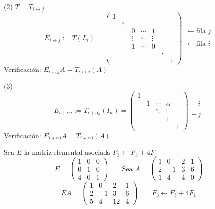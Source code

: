 \documentclass[11pt,a4paper]{article}
\begin{document}
(2) $T=T_{i\leftrightarrow j}$
\[
E_{i\leftrightarrow j}:=T(I_n)=\begin{pmatrix}
1&&&&&&\\
&\ddots&&&&&\\
&&0&\cdots&1&&\\
&&\vdots&\ddots&\vdots&&\\
&&1&\cdots&0&&\\
&&&&&\ddots&\\
&&&&&&1
\end{pmatrix}
\begin{matrix}\\\\\leftarrow\text{fila } j\\\\\leftarrow\text{fila } i\\\\\\\end{matrix}
\]
Verificación: $E_{i\leftrightarrow j}A=T_{i\leftrightarrow j}(A)$

(3)
\[
E_{i+\alpha j}:=T_{i+\alpha j}(I_n)=\begin{pmatrix}
1&&&&\\
&1&\cdots&\alpha&\\
&&\ddots&\vdots&\\
&&&1&\\
&&&&1
\end{pmatrix}
\begin{matrix}\\-\,i\\\\-\,j\\\\\end{matrix}
\]
Verificación: $E_{i+\alpha j}A=T_{i+\alpha j}(A)$

\begin{ejemplo}
Sea $E$ la matriz elemental asociada $F_3\leftarrow F_3+4F_1$
\[
E=\begin{pmatrix}1&0&0\\0&1&0\\4&0&1\end{pmatrix}\qquad
\text{Sea } A=\begin{pmatrix}1&0&2&1\\2&-1&3&6\\1&4&4&0\end{pmatrix}
\]
\[
EA=\begin{pmatrix}1&0&2&1\\2&-1&3&6\\5&4&12&4\end{pmatrix}\qquad F_3\leftarrow F_3+4F_1
\]
\end{ejemplo}
\end{document}
